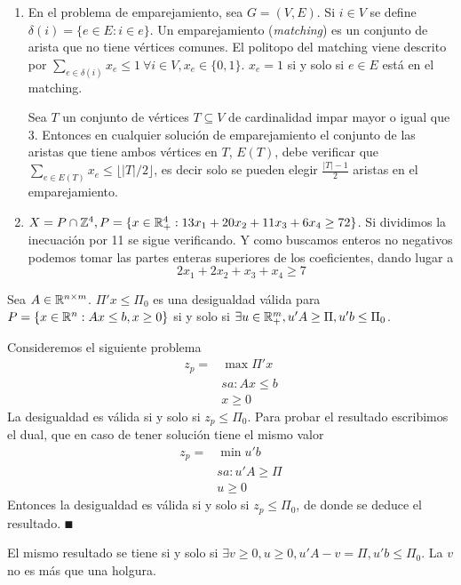 \documentclass[MIOP.tex]{subfiles}
\begin{document}
\begin{ejs}
\begin{enumerate}
\item En el problema de emparejamiento, sea $G=(V,E)$. Si $i\in V$ se define $\delta(i)=\{e\in E:i\in e\}$. Un emparejamiento (\emph{matching}) es un conjunto de arista que no tiene vértices comunes. El politopo del matching viene descrito por $\sum_{e\in\delta(i)}x_e\leq 1\ \forall i\in V, x_e\in\{0,1\}$. $x_e=1$ si y solo si $e\in E$ está en el matching.  

Sea $T$ un conjunto de vértices $T\subseteq V$ de cardinalidad impar mayor o igual que 3. Entonces en cualquier solución de emparejamiento el conjunto de las aristas que tiene ambos vértices en $T$, $E(T)$, debe verificar que $\sum_{e\in E(T)}x_e\leq\lfloor |T|/2\rfloor$, es decir solo se pueden elegir $\frac{|T|-1}{2}$ aristas en el emparejamiento.
\item $X=P\cap\mathbb{Z}^4, P=\{x\in\mathbb{R}^4_+:13x_1+20x_2+11x_3+6x_4\geq 72\}$. Si dividimos la inecuación por 11 se sigue verificando. Y como buscamos enteros no negativos podemos tomar las partes enteras superiores de los coeficientes, dando lugar a 
$$2x_1+2x_2+x_3+x_4\geq 7$$
\end{enumerate}
\end{ejs}

\begin{prop}
Sea $A\in\mathbb{R}^{n\times m}$. $\Pi'x\leq\Pi_0$ es una desigualdad válida para $P=\{x\in\mathbb{R}^n:Ax\leq b,x\geq 0\}$ si y solo si $\exists u\in\mathbb{R}^m_+,u'A\geq\Pi,u'b\leq\Pi_0$.
\end{prop}
\begin{dem}
Consideremos el siguiente problema
\begin{align*}
z_p=& \max \Pi'x\\
   &sa: Ax\leq b\\
   &x\geq 0
\end{align*}
La desigualdad es válida si y solo si $z_p\leq\Pi_0$. Para probar el resultado escribimos el dual, que en caso de tener solución tiene el mismo valor
\begin{align*}
z_p=& \min u'b\\
   &sa: u'A\geq \Pi\\
   &u\geq 0
\end{align*}
Entonces la desigualdad es válida si y solo si $z_p\leq\Pi_0$, de donde se deduce el resultado. 
$\QED$
\end{dem}
\begin{coro}
El mismo resultado se tiene si y solo si $\exists v\geq 0, u\geq 0, u'A-v= \Pi, u'b\leq\Pi_0$. La $v$ no es más que una holgura.
\end{coro}
\end{document}
